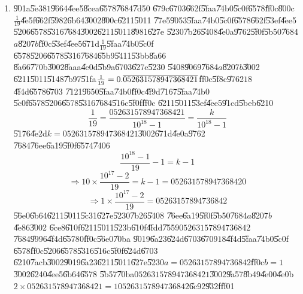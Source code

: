 \documentclass{article}
\begin{document}
\begin{enumerate}
\item \U{901a}\U{5e38}$1$\U{9664}\U{4ee5}\U{8cea}\U{6578}\U{7684}\U{7d50}%
\U{679c}\U{6703}\U{662f}\U{5faa}\U{74b0}\U{5c0f}\U{6578}\U{ff0c}\U{800c}$%
\frac{1}{19}$\U{4e5f}\U{662f}\U{5982}\U{6b64}\U{3002}\U{800c}\U{6211}\U{5011}%
\U{77e5}\U{9053}\U{5faa}\U{74b0}\U{5c0f}\U{6578}\U{662f}\U{53ef}\U{4ee5}%
\U{5206}\U{6578}\U{5316}\U{7684}\U{3002}\U{6211}\U{5011}\U{8981}\U{627e}%
\U{5230}\U{7b26}\U{5408}\U{4e0a}\U{9762}\U{5f0f}\U{5b50}\U{7684}$a$\U{8207}$b
$\U{ff0c}\U{53ef}\U{4ee5}\U{671d}$\frac{1}{19}$\U{5faa}\U{74b0}\U{5c0f}%
\U{6578}\U{5206}\U{6578}\U{5316}\U{7684}\U{65b9}\U{5411}\U{53bb}\U{8a66}%
\U{8a66}\U{770b}\U{3002}\U{8aaa}\U{4e0d}\U{5b9a}\U{6703}\U{627e}\U{5230}%
\U{5408}\U{9069}\U{7684}$a$\U{8207}$b$\U{3002}\newline
\U{6211}\U{5011}\U{5148}\U{7b97}\U{51fa}$\frac{1}{19}=0.\overline{%
052631578947368421}$\U{ff0c}\U{5f8c}\U{9762}$18$\U{4f4d}\U{6578}\U{6703}%
\U{7121}\U{9650}\U{5faa}\U{74b0}\U{ff0c}\U{4f9d}\U{7167}\U{5faa}\U{74b0}%
\U{5c0f}\U{6578}\U{5206}\U{6578}\U{5316}\U{7684}\U{516c}\U{5f0f}\U{ff0c}%
\U{6211}\U{5011}\U{53ef}\U{4ee5}\U{91cd}\U{5beb}\U{6210}%
\[
\frac{1}{19}=\frac{052631578947368421}{10^{18}-1}=\frac{k}{10^{18}-1}
\]%
\U{5176}\U{4e2d}$k=052631578947368421$\U{3002}\U{671d}\U{4e0a}\U{9762}%
\U{7684}\U{76ee}\U{6a19}\U{5f0f}\U{6574}\U{7406}%
\[
\frac{10^{18}-1}{19}-1=k-1
\]%
\[
\Rightarrow 10\times \frac{10^{17}-2}{19}=k-1=052631578947368420
\]%
\[
\Rightarrow 1\times \frac{10^{17}-2}{19}=05263157894736842
\]%
\U{56e0}\U{6b64}\U{6211}\U{5011}\U{5c31}\U{627e}\U{5230}\U{7b26}\U{5408}%
\U{76ee}\U{6a19}\U{5f0f}\U{5b50}\U{7684}$a$\U{8207}$b$\U{4e86}\U{3002}%
\U{6ce8}\U{610f}\U{6211}\U{5011}\U{523b}\U{610f}\U{4fdd}\U{7559}$%
05263157894736842$\U{7684}\U{9996}\U{4f4d}\U{6578}$0$\U{ff0c}\U{56e0}\U{70ba}%
\U{9019}\U{6a23}\U{624d}\U{6703}\U{6709}$18$\U{4f4d}\U{5faa}\U{74b0}\U{5c0f}%
\U{6578}\U{ff0c}\U{5206}\U{6578}\U{5316}\U{516c}\U{5f0f}\U{624d}\U{6703}%
\U{6210}\U{7acb}\U{3002}\U{9019}\U{6a23}\U{6211}\U{5011}\U{627e}\U{5230}$%
a=05263157894736842$\U{ff0c}$b=1$\U{3002}\U{6240}\U{4ee5}\U{6b64}\U{6578}%
\U{5b57}\U{70ba}$052631578947368421$\U{3002}\U{9a57}\U{8b49}\U{4e00}\U{4e0b}$%
2\times 052631578947368421=105263157894736842$\U{6c92}\U{932f}\U{ff01}


\end{enumerate}
\end{document}
